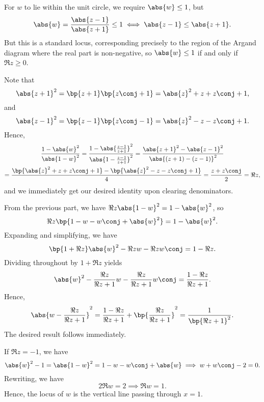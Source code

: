 \begin{solution}
    \begin{ppart}
        For $w$ to lie within the unit circle, we require $\abs{w} \leq 1$, but \[\abs{w} = \frac{\abs{z-1}}{\abs{z+1}} \leq 1 \iff \abs{z-1} \leq \abs{z+1}.\] But this is a standard locus, corresponding precisely to the region of the Argand diagram where the real part is non-negative, so $\abs{w} \leq 1$ if and only if $\Re{z} \geq 0$.
    \end{ppart}
    \begin{ppart}
        \begin{psubpart}
            Note that \[\abs{z+1}^2 = \bp{z+1}\bp{z\conj +1} = \abs{z}^2 + z + z\conj + 1,\] and \[\abs{z-1}^2 = \bp{z-1}\bp{z\conj-1} = \abs{z}^2 - z - z\conj + 1.\] Hence,
            \begin{gather*}
                \frac{1 - \abs{w}^2}{\abs{1 - w}^2} = \frac{1 - \abs{\frac{z-1}{z+1}}^2}{\abs{1 - \frac{z-1}{z+1}}^2} = \frac{\abs{z+1}^2 - \abs{z-1}^2}{\abs{(z+1)-(z-1)}^2} \\
                = \frac{\bp{\abs{z}^2 + z + z\conj + 1} - \bp{\abs{z}^2 - z - z\conj + 1}}{4} = \frac{z + z\conj}{2} = \Re z,
            \end{gather*}
            and we immediately get our desired identity upon clearing denominators.
        \end{psubpart}
        \begin{psubpart}
            From the previous part, we have $\Re{z} \abs{1 - w}^2 = 1 - \abs{w}^2$, so \[\Re{z} \bp{1 - w - w\conj + \abs{w}^2} = 1 - \abs{w}^2.\] Expanding and simplifying, we have \[\bp{1 + \Re{z}} \abs{w}^2 - \Re{z} w - \Re{z} w\conj = 1 - \Re{z}.\] Dividing throughout by $1 + \Re{z}$ yields \[\abs{w}^2 - \frac{\Re{z}}{\Re{z} + 1} w- \frac{\Re{z}}{\Re{z} + 1} w\conj = \frac{1 - \Re{z}}{\Re{z} + 1}.\] Hence, \[\abs{w - \frac{\Re{z}}{\Re{z} +1}}^2 = \frac{1 - \Re{z}}{\Re{z} + 1} + \bp{\frac{\Re{z}}{\Re{z} + 1}}^2 = \frac1{\bp{\Re{z} + 1}^2}.\] The desired result follows immediately.
        \end{psubpart}
        \begin{psubpart}
            If $\Re{z} = -1$, we have \[\abs{w}^2 - 1 = \abs{1 - w}^2 = 1 - w - w\conj + \abs{w} \implies w + w\conj -2 = 0.\] Rewriting, we have \[2\Re{w} = 2 \implies \Re{w} = 1.\] Hence, the locus of $w$ is the vertical line passing through $x = 1$.
        \end{psubpart}
    \end{ppart}
\end{solution}

